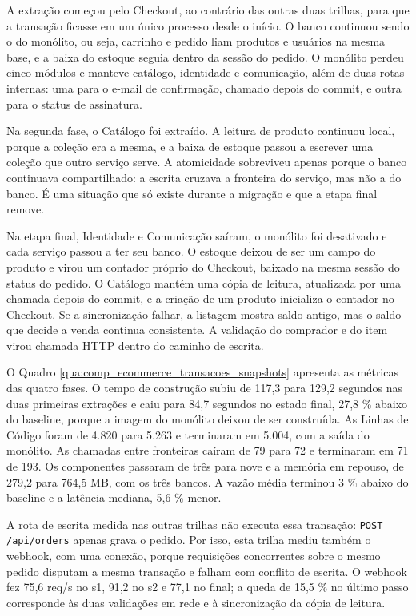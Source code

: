 A extração começou pelo Checkout, ao contrário das outras duas trilhas, para que a transação ficasse em um único processo desde o início. O banco continuou sendo o do monólito, ou seja, carrinho e pedido liam produtos e usuários na mesma base, e a baixa do estoque seguia dentro da sessão do pedido. O monólito perdeu cinco módulos e manteve catálogo, identidade e comunicação, além de duas rotas internas: uma para o e-mail de confirmação, chamado depois do commit, e outra para o status de assinatura.

Na segunda fase, o Catálogo foi extraído. A leitura de produto continuou local, porque a coleção era a mesma, e a baixa de estoque passou a escrever uma coleção que outro serviço serve. A atomicidade sobreviveu apenas porque o banco continuava compartilhado: a escrita cruzava a fronteira do serviço, mas não a do banco. É uma situação que só existe durante a migração e que a etapa final remove.

Na etapa final, Identidade e Comunicação saíram, o monólito foi desativado e cada serviço passou a ter seu banco. O estoque deixou de ser um campo do produto e virou um contador próprio do Checkout, baixado na mesma sessão do status do pedido. O Catálogo mantém uma cópia de leitura, atualizada por uma chamada depois do commit, e a criação de um produto inicializa o contador no Checkout. Se a sincronização falhar, a listagem mostra saldo antigo, mas o saldo que decide a venda continua consistente. A validação do comprador e do item virou chamada HTTP dentro do caminho de escrita.

O Quadro \ref{qua:comp_ecommerce_transacoes_snapshots} apresenta as métricas das quatro fases. O tempo de construção subiu de 117,3 para 129,2 segundos nas duas primeiras extrações e caiu para 84,7 segundos no estado final, 27,8 \% abaixo do baseline, porque a imagem do monólito deixou de ser construída. As Linhas de Código foram de 4.820 para 5.263 e terminaram em 5.004, com a saída do monólito. As chamadas entre fronteiras caíram de 79 para 72 e terminaram em 71 de 193. Os componentes passaram de três para nove e a memória em repouso, de 279,2 para 764,5 MB, com os três bancos. A vazão média terminou 3 \% abaixo do baseline e a latência mediana, 5,6 \% menor.

A rota de escrita medida nas outras trilhas não executa essa transação: \texttt{POST /api/orders} apenas grava o pedido. Por isso, esta trilha mediu também o webhook, com uma conexão, porque requisições concorrentes sobre o mesmo pedido disputam a mesma transação e falham com conflito de escrita. O webhook fez 75,6 req/s no s1, 91,2 no s2 e 77,1 no final; a queda de 15,5 \% no último passo corresponde às duas validações em rede e à sincronização da cópia de leitura.

